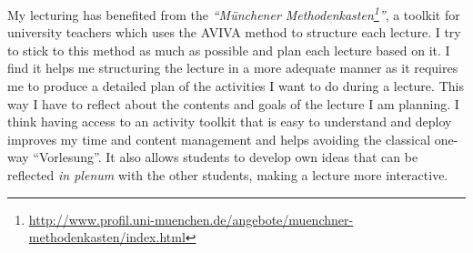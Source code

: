 \documentclass[a4paper,11pt]{article}
\begin{document}
My lecturing has benefited from the \emph{``M\"unchener Methodenkasten\footnote{\href{http://www.profil.uni-muenchen.de/angebote/muenchner-methodenkasten/index.html}{http://www.profil.uni-muenchen.de/angebote/muenchner-methodenkasten/index.html}}''}, a toolkit for university teachers which uses the AVIVA method to structure each lecture. I try to stick to this method as much as possible and plan each lecture based on it. I find it helps me structuring the lecture in a more adequate manner as it requires me to produce a detailed plan of the activities I want to do during a lecture. This way I have to reflect about the contents and goals of the lecture I am planning. I think having access to an activity toolkit that is easy to understand and deploy improves my time and content management and helps avoiding the classical one-way ``Vorlesung''. It also allows students to develop own ideas that can be reflected \emph{in plenum} with the other students, making a lecture more interactive.\\
\end{document}
